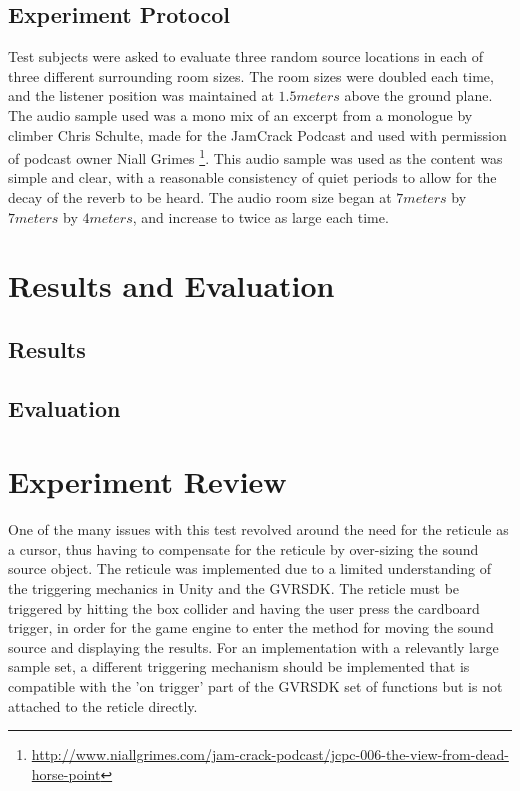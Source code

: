\documentclass[paper=a4, fontsize=10pt, font=arial]{scrartcl} %
\numberwithin{equation}{section} %
\numberwithin{figure}{section} %
\numberwithin{table}{section} %
\begin{document}
	\subsection{Experiment Protocol}
Test subjects were asked to evaluate three random source locations in each of three different surrounding room sizes. The room sizes were doubled each time, and the listener position was maintained at $1.5 meters$ above the ground plane. The audio sample used was a mono mix of an excerpt from a monologue by climber Chris Schulte, made for the JamCrack Podcast and used with permission of podcast owner Niall Grimes \footnote{ \url{http://www.niallgrimes.com/jam-crack-podcast/jcpc-006-the-view-from-dead-horse-point}}. This audio sample was used as the content was simple and clear, with a reasonable consistency of quiet periods to allow for the decay of the reverb to be heard. The audio room size began at $7 meters$ by $7 meters$ by $4 meters$, and increase to twice as large each time.

\section{Results and Evaluation}
	\subsection{Results}


	\subsection{Evaluation}


\section{Experiment Review}

One of the many issues with this test revolved around the need for the reticule as a cursor, thus having to compensate for the reticule by over-sizing the sound source object. The reticule was implemented due to a limited understanding of the triggering mechanics in Unity and the GVRSDK. The reticle must be triggered by hitting the box collider and having the user press the cardboard trigger, in order for the game engine to enter the method for moving the sound source and displaying the results. For an implementation with a relevantly large sample set, a different triggering mechanism should be implemented that is compatible with the 'on trigger' part of the GVRSDK set of functions but is not attached to the reticle directly. 
\end{document}
